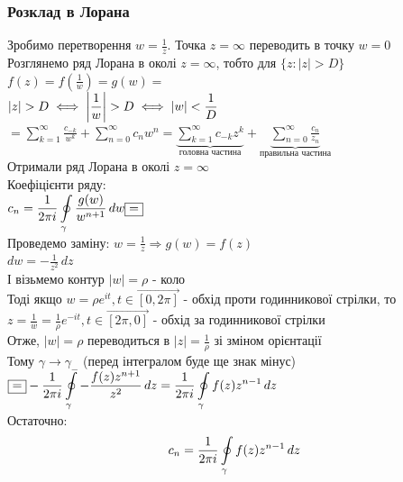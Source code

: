 \documentclass[a4paper, 14pt]{extarticle}
\def\hugespace{\vspace{5mm} \\}
\begin{document}
\subsubsection{Розклад в Лорана}
Зробимо перетворення $\displaystyle w = \frac{1}{z}$. Точка $z = \infty$ переводить в точку $w = 0$\\
Розглянемо ряд Лорана в околі $z = \infty$, тобто для $\{z: |z|>D\}$\\
$\displaystyle f(z) = f(\frac{1}{w}) = g(w) = $\\
$|z|>D \iff \displaystyle \abs{\frac{1}{w}} > D \iff |w| < \frac{1}{D}$\\
$\displaystyle = \sum_{k=1}^{\infty} \frac{c_{-k}}{w^k} + \sum_{n=0}^{\infty} c_n w^n = \underbrace{\sum_{k=1}^{\infty} c_{-k}z^k}_{\textrm{головна частина}} + \underbrace{\sum_{n=0}^{\infty} \frac{c_n}{z_n}}_{\textrm{правильна частина}}$\\
Отримали ряд Лорана в околі $z = \infty$
\hugespace
Коефіцієнти ряду:\\
$\displaystyle c_n = \frac{1}{2 \pi i} \oint\displaylimits_{\gamma} \frac{g(w)}{w^{n+1}} \,dw \boxed{=} $\\
Проведемо заміну: $\displaystyle w = \frac{1}{z} \Rightarrow g(w) = f(z)$\\
$\displaystyle dw = -\frac{1}{z^2} \,dz$\\
І візьмемо контур $|w|=\rho$ - коло\\
Тоді якщо $w = \rho e^{it}, t \in \displaystyle \vec{[0, 2\pi]}$ - обхід проти годинникової стрілки, то\\
$z = \displaystyle \frac{1}{w} = \frac{1}{\rho} e^{-it}, t \in \displaystyle \vec{[2 \pi, 0]}$ - обхід за годинникової стрілки\\
Отже, $|w| = \rho$ переводиться в $\displaystyle |z| = \frac{1}{\rho}$ зі зміном орієнтації\\
Тому $\gamma \rightarrow \gamma_{-}$ (перед інтегралом буде ще знак мінус)\\
$\displaystyle \boxed{=} - \frac{1}{2 \pi i} \oint\displaylimits_{\gamma} -\frac{f(z) z^{n+1}}{z^2} \,dz = \frac{1}{2 \pi i} \oint\displaylimits_{\gamma} f(z) z^{n-1} \,dz$\\
Остаточно:
\begin{align*}
c_n = \frac{1}{2 \pi i} \oint\displaylimits_{\gamma} f(z) z^{n-1} \,dz
\end{align*}
\\
\end{document}
